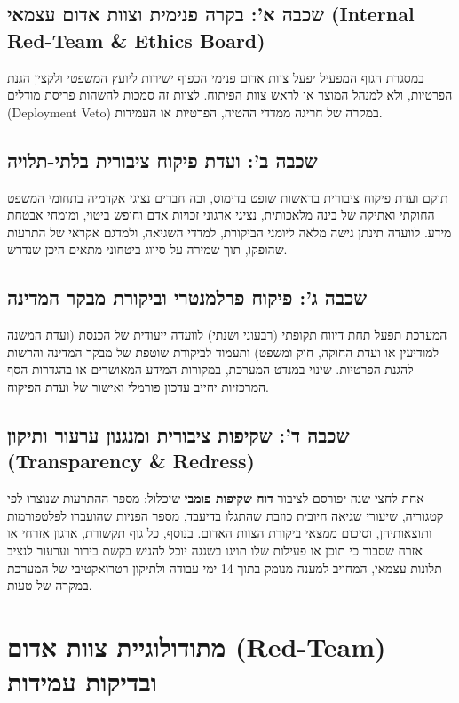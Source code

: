 \subsection{שכבה א': בקרה פנימית וצוות אדום עצמאי (\textenglish{Internal Red-Team \& Ethics Board})}
במסגרת הגוף המפעיל יפעל צוות אדום פנימי הכפוף ישירות ליועץ המשפטי ולקצין הגנת הפרטיות, ולא למנהל המוצר או לראש צוות הפיתוח. לצוות זה סמכות להשהות פריסת מודלים (\textenglish{Deployment Veto}) במקרה של חריגה ממדדי ההטיה, הפרטיות או העמידות.

\subsection{שכבה ב': ועדת פיקוח ציבורית בלתי-תלויה}
תוקם ועדת פיקוח ציבורית בראשות שופט בדימוס, ובה חברים נציגי אקדמיה בתחומי המשפט החוקתי ואתיקה של בינה מלאכותית, נציגי ארגוני זכויות אדם וחופש ביטוי, ומומחי אבטחת מידע. לוועדה תינתן גישה מלאה ליומני הביקורת, למדדי השגיאה, ולמדגם אקראי של התרעות שהופקו, תוך שמירה על סיווג ביטחוני מתאים היכן שנדרש.

\subsection{שכבה ג': פיקוח פרלמנטרי וביקורת מבקר המדינה}
המערכת תפעל תחת דיווח תקופתי (רבעוני ושנתי) לוועדה ייעודית של הכנסת (ועדת המשנה למודיעין או ועדת החוקה, חוק ומשפט) ותעמוד לביקורת שוטפת של מבקר המדינה והרשות להגנת הפרטיות. שינוי במנדט המערכת, במקורות המידע המאושרים או בהגדרות הסף המרכזיות יחייב עדכון פורמלי ואישור של ועדת הפיקוח.

\subsection{שכבה ד': שקיפות ציבורית ומנגנון ערעור ותיקון (\textenglish{Transparency \& Redress})}
אחת לחצי שנה יפורסם לציבור \textbf{דוח שקיפות פומבי} שיכלול: מספר ההתרעות שנוצרו לפי קטגוריה, שיעורי שגיאה חיובית כוזבת שהתגלו בדיעבד, מספר הפניות שהועברו לפלטפורמות ותוצאותיהן, וסיכום ממצאי ביקורת הצוות האדום. בנוסף, כל גוף תקשורת, ארגון אזרחי או אזרח שסבור כי תוכן או פעילות שלו תויגו בשגגה יוכל להגיש בקשת בירור וערעור לנציב תלונות עצמאי, המחויב למענה מנומק בתוך \textenglish{14} ימי עבודה ולתיקון רטרואקטיבי של המערכת במקרה של טעות.

\section{מתודולוגיית צוות אדום (\textenglish{Red-Team}) ובדיקות עמידות}
\label{sec:redteam_methodology}

